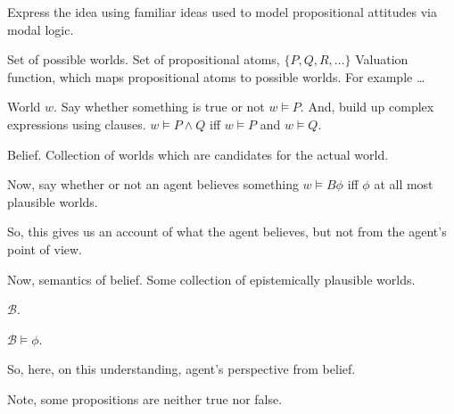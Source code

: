 \begin{note}
  Express the idea using familiar ideas used to model propositional attitudes via modal logic.

  Set of possible worlds.
  Set of propositional atoms, \(\{P,Q,R,\dots\}\)
  Valuation function, which maps propositional atoms to possible worlds.
  For example \dots

  World \(w\).
  Say whether something is true or not \(w \vDash P\).
  And, build up complex expressions using clauses.
  \(w \vDash P \land Q\) iff \(w \vDash P\) and \(w \vDash Q\).

  Belief.
  Collection of worlds which are candidates for the actual world.

  Now, say whether or not an agent believes something \(w \vDash B\phi\) iff \(\phi\) at all most plausible worlds.

  So, this gives us an account of what the agent believes, but not from the agent's point of view.

  Now, semantics of belief.
  Some collection of epistemically plausible worlds.

  \(\mathcal{B}\).

  \(\mathcal{B} \vDash \phi\).

  So, here, on this understanding, agent's perspective from belief.

  Note, some propositions are neither true nor false.
\end{note}

